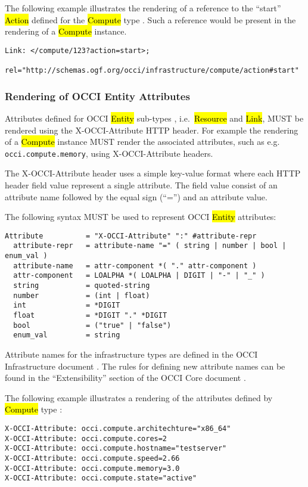 \documentclass[10pt,a4paper]{article}
\begin{document}
The following example illustrates the rendering of a reference to the
``start'' \hl{Action} defined for the \hl{Compute} type
\cite{occi:infrastructure}. Such a reference would be present in the
rendering of a \hl{Compute} instance.

\begin{verbatim}
Link: </compute/123?action=start>;
    rel="http://schemas.ogf.org/occi/infrastructure/compute/action#start"
\end{verbatim}

\subsubsection{Rendering of OCCI Entity Attributes}
Attributes defined for OCCI \hl{Entity} sub-types \cite{occi:core},
i.e.~\hl{Resource} and \hl{Link}, MUST be rendered using the
X-OCCI-Attribute HTTP header. For example the rendering of a
\hl{Compute} instance MUST render the associated attributes, such as
e.g. \texttt{occi.compute.memory}, using X-OCCI-Attribute headers.

The X-OCCI-Attribute header uses a simple key-value format where each
HTTP header field value represent a single attribute. The field value
consist of an attribute name followed by the equal sign (``='') and an
attribute value.

The following syntax MUST be used to represent OCCI \hl{Entity}
attributes:

\begin{verbatim}
Attribute          = "X-OCCI-Attribute" ":" #attribute-repr
  attribute-repr   = attribute-name "=" ( string | number | bool | enum_val )
  attribute-name   = attr-component *( "." attr-component )
  attr-component   = LOALPHA *( LOALPHA | DIGIT | "-" | "_" )	
  string           = quoted-string
  number           = (int | float)
  int              = *DIGIT
  float            = *DIGIT "." *DIGIT
  bool             = ("true" | "false")
  enum_val         = string
\end{verbatim}

Attribute names for the infrastructure types are defined in the OCCI
Infrastructure document \cite{occi:infrastructure}.  The rules for
defining new attribute names can be found in the ``Extensibility''
section of the OCCI Core document \cite{occi:core}.

The following example illustrates a rendering of the attributes
defined by \hl{Compute} type \cite{occi:infrastructure}:

\begin{verbatim}
X-OCCI-Attribute: occi.compute.architechture="x86_64"
X-OCCI-Attribute: occi.compute.cores=2
X-OCCI-Attribute: occi.compute.hostname="testserver"
X-OCCI-Attribute: occi.compute.speed=2.66
X-OCCI-Attribute: occi.compute.memory=3.0
X-OCCI-Attribute: occi.compute.state="active"
\end{verbatim}
\end{document}
